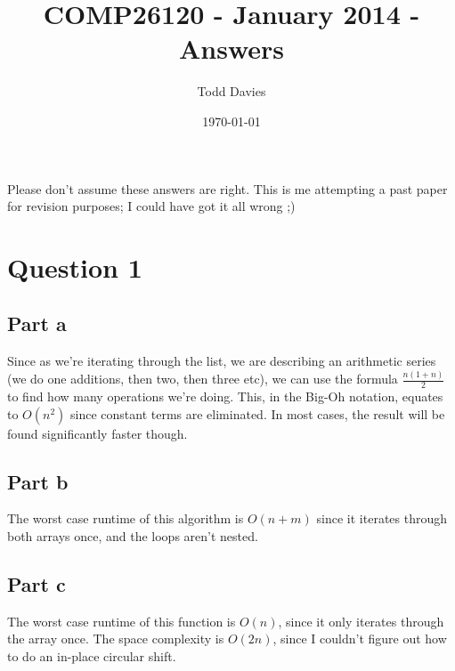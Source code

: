 \documentclass{article}
\author{Todd Davies}
\title{COMP26120 - January 2014 - Answers}
\date{\today}
\begin{document}
\lhead{\today}

\maketitle

\begin{center}
	\small Please don't assume these answers are right. This is me attempting a
	past paper for revision purposes; I could have got it all wrong ;)
\end{center}

\section{Question 1}

\subsection{Part a}



Since as we're iterating through the list, we are describing an arithmetic series
(we do one additions, then two, then three etc), we can use the formula
$\frac{n(1+n)}{2}$ to find how many operations we're doing. This, in the Big-Oh
notation, equates to $O(n^2)$ since constant terms are eliminated. In most
cases, the result will be found significantly faster though.

\newpage

\subsection{Part b}



The worst case runtime of this algorithm is $O(n + m)$ since it iterates through
both arrays once, and the loops aren't nested.

\newpage

\subsection{Part c}



The worst case runtime of this function is $O(n)$, since it only iterates
through the array once. The space complexity is $O(2n)$, since I couldn't figure
out how to do an in-place circular shift.
\end{document}
